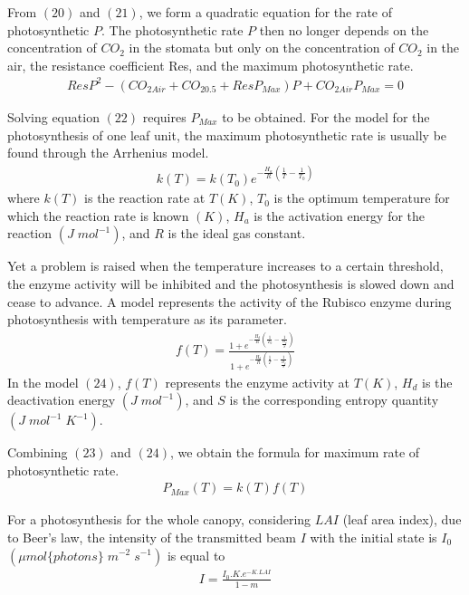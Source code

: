 \documentclass[a4paper]{article}
\begin{document}
From $(20)$ and $(21)$, we form a quadratic equation for the rate of photosynthetic \(P\). The photosynthetic rate \(P\) then no longer depends on the concentration of \(CO_2\) in the stomata but only on the concentration of \(CO_2\) in the air, the resistance coefficient Res, and the maximum photosynthetic rate.
\begin{gather}
  ResP^2 - (CO_{2Air} + CO_{2 0.5} + ResP_{Max})P + CO_{2Air}P_{Max} = 0
\end{gather}

Solving equation $(22)$ requires \(P_{Max}\) to be obtained. For the model for the photosynthesis of one leaf unit, the maximum photosynthetic rate is usually be found through the Arrhenius model.
\begin{gather}
  k(T) = k(T_0)e^{-\frac{H_a}{R}(\frac{1}{T} - \frac{1}{T_0})}
\end{gather}
where \(k(T)\) is the reaction rate at \(T (K)\), \(T_0\) is the optimum temperature for which the reaction
rate is known \((K)\), \(H_a\) is the activation energy for the reaction \((J\;mol^{-1})\), and \(R\) is the ideal gas constant.

Yet a problem is raised when the temperature increases to a certain threshold, the enzyme activity will be inhibited and the photosynthesis is slowed down and cease to advance. A model represents the activity of the Rubisco enzyme during photosynthesis with temperature as its parameter.
\begin{gather}
  f(T) = \frac{1 + e^{-\frac{H_d}{R}( \frac{1}{T_0} - \frac{1}{\frac{H_d}{S}} )}}{1 + e^{-\frac{H_d}{R}(\frac{1}{T} - \frac{1}{\frac{H_d}{S}})}}
\end{gather}
In the model $(24)$, \(f(T)\) represents the enzyme activity at \(T(K)\), \(H_d\) is the deactivation energy \((J\;mol^{-1})\), and \(S\) is the corresponding entropy quantity \((J\;mol^{-1}\;K^{-1})\).

Combining $(23)$ and $(24)$, we obtain the formula for maximum rate of photosynthetic rate.
\begin{gather}
  P_{Max}(T) = k(T)f(T)
\end{gather}

For a photosynthesis for the whole canopy, considering \(LAI\) (leaf area index), due to Beer's law, the intensity of the transmitted beam \(I\) with the initial state is \(I_0\) \((\mu mol\{photons\}\;m^{-2}\;s^{-1})\) is equal to
\begin{gather}
  I = \frac{I_0.K.e^{-K.LAI}}{1 - m}
\end{gather}
\end{document}

